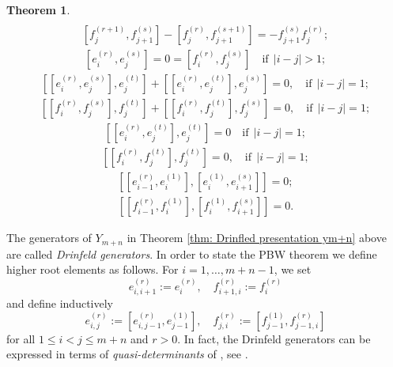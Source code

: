 \documentclass[12pt,reqno]{amsart}
\numberwithin{equation}{section}
\newtheorem{Theorem}{Theorem}[section]
\theoremstyle{Theorem}
\theoremstyle{remark}
\numberwithin{equation}{section}
\begin{document}
\begin{Theorem}
\begin{align}
\end{align}
\begin{align}\label{Drinfeld generators relation 7}
[f_j^{(r+1)},f_{j+1}^{(s)}]-[f_j^{(r)},f_{j+1}^{(s+1)}]=-f_{j+1}^{(s)}f_{j}^{(r)};
\end{align}
\begin{align}\label{Drinfeld generators relation 0}
[e_i^{(r)},e_j^{(s)}]=0=[f_i^{(r)},f_j^{(s)}]\quad\mbox{if}~~|i-j|>1;
\end{align}
\begin{align}\label{Drinfeld generators relation 8}
[[e_i^{(r)},e_j^{(s)}],e_j^{(t)}]+[[e_i^{(r)},e_j^{(t)}],e_j^{(s)}]=0,\quad\mbox{if}~~|i-j|=1;
\end{align}
\begin{align}\label{Drinfeld generators relation 9}
[[f_i^{(r)},f_j^{(s)}],f_j^{(t)}]+[[f_i^{(r)},f_j^{(t)}],f_j^{(s)}]=0,\quad\mbox{if}~~|i-j|=1;
\end{align}
\begin{align}\label{Drinfeld generators relation 10}
[[e_i^{(r)},e_j^{(t)}],e_j^{(t)}]=0\quad\mbox{if}~~|i-j|=1;
\end{align}
\begin{align}\label{Drinfeld generators relation 11}
[[f_i^{(r)},f_j^{(t)}],f_j^{(t)}]=0,\quad\mbox{if}~~|i-j|=1;
\end{align}
\begin{align}\label{Drinfeld generators relation 12}
[[e_{i-1}^{(r)},e_i^{(1)}],[e_i^{(1)},e_{i+1}^{(s)}]]=0;
\end{align}
\begin{align}\label{Drinfeld generators relation 13}
[[f_{i-1}^{(r)},f_i^{(1)}],[f_i^{(1)},f_{i+1}^{(s)}]]=0.
\end{align}
\end{Theorem}
The generators of $Y_{m+n}$ in Theorem \ref{thm: Drinfled presentation ym+n} above are called {\it Drinfeld generators}. 
In order to state the PBW theorem we define higher root elements as follows. 
For $i=1,\dots,m+n-1$, we set
\[
e_{i,i+1}^{(r)}:=e_i^{(r)},\quad  f_{i+1,i}^{(r)}:=f_{i}^{(r)}   
\]
and define inductively
\[
e_{i,j}^{(r)}:=[e_{i,j-1}^{(r)},e_{j-1}^{(1)}],\quad f_{j,i}^{(r)}:=[f_{j-1}^{(1)},f_{j-1,i}^{(r)}]
\]
for all $1\leq i<j\leq m+n$ and $r>0$.
In fact, the Drinfeld generators can be expressed in terms of {\it quasi-determinants} of \cite{GR97}, see \cite[Section 5]{BK05}.
\end{document}
